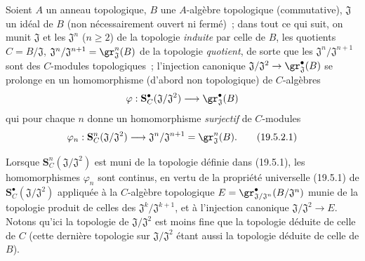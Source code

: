 \begin{env}[19.5.2]
\label{0.19.5.2-fr}
Soient $A$ un anneau topologique, $B$ une $A$-algèbre topologique
(commutative), $\mathfrak J$ un idéal de $B$ (non nécessairement ouvert ni
fermé)~; dans tout ce qui suit, on munit $\mathfrak J$ et les
$\mathfrak J^n$ ($n\geq2$) de la topologie \emph{induite} par celle de $B$,
les quotients $C=B/\mathfrak J$,
$\mathfrak J^n/\mathfrak J^{n+1}=\gr_{\mathfrak J}^n(B)$ de la topologie
\emph{quotient}, de sorte que les $\mathfrak J^n/\mathfrak J^{n+1}$ sont des
$C$-modules topologiques~; l'injection canonique
$\mathfrak J/\mathfrak J^2\to\gr_{\mathfrak J}^\bullet(B)$ se prolonge en un
homomorphisme (d'abord non topologique) de $C$-algèbres
\[
  \varphi:\mathbf S_C^\bullet(\mathfrak J/\mathfrak J^2)
  \longrightarrow\gr_{\mathfrak J}^\bullet(B)
\]
qui pour chaque $n$ donne un homomorphisme \emph{surjectif} de $C$-modules
\begin{equation}
\label{0.19.5.2.1-fr}
  \varphi_n:\mathbf S_C^n(\mathfrak J/\mathfrak J^2)
  \longrightarrow\mathfrak J^n/\mathfrak J^{n+1}
  =\gr_{\mathfrak J}^n(B).
  \tag{19.5.2.1}
\end{equation}

Lorsque $\mathbf S_C^n(\mathfrak J/\mathfrak J^2)$ est muni de la topologie
définie dans (19.5.1), les homomorphismes $\varphi_n$ sont continus, en vertu
de la propriété universelle (19.5.1) de
$\mathbf S_C^\bullet(\mathfrak J/\mathfrak J^2)$
appliquée à la $C$-algèbre
topologique $E=\gr^\bullet_{\mathfrak J/\mathfrak J^n}(B/\mathfrak J^n)$ munie de la
topologie produit de celles des $\mathfrak J^k/\mathfrak J^{k+1}$, et à
l'injection canonique $\mathfrak J/\mathfrak J^2\to E$. Notons qu'ici la
topologie de $\mathfrak J/\mathfrak J^2$ est moins fine que la topologie
déduite de celle de $C$ (cette dernière topologie sur
$\mathfrak J/\mathfrak J^2$ étant aussi la topologie déduite de celle de $B$).
\end{env}

